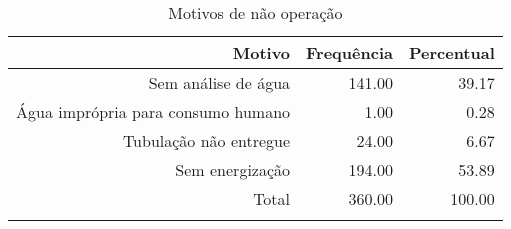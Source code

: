 \documentclass[a4paper, 12pt, openright, oneside, english, brazil, article]{abntex2}
\begin{document}
	
	\begin{scriptsize}
		\begin{longtable}{rrr}
			\caption{Motivos de não operação} \\ 
			\hline
			Motivo & Frequência & Percentual \\ 
			\hline
			Sem análise de água & 141.00 & 39.17 \\
			Água imprópria para consumo humano & 1.00 & 0.28 \\  
			Tubulação não entregue & 24.00 & 6.67 \\
			Sem energização& 194.00 & 53.89 \\
			\hline
			Total & 360.00 & 100.00 \\ 
			\hline
			\hline
			\label{mot-nao-operacao}
		\end{longtable}
	\end{scriptsize}
	
	
	
	
\end{document}
